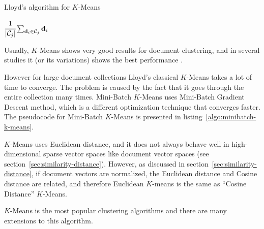 \begin{algorithm}
\caption{Lloyd's algorithm for $K$-Means}
\label{algo:k-means}

\begin{algorithmic}[0]
  \Statex
     
    \EndFor

       
      \EndFor

       
            {$\cfrac{1}{| \mathcal C_j |} \sum_{\mathbf d_i \in \mathcal C_j} \mathbf d_i$}
      \EndFor
    \EndWhile

    \State {}
  \EndFunction
\end{algorithmic}
\end{algorithm}

Usually, $K$-Means shows very good results for document clustering, and in
several studies it (or its variations) shows the best performance \cite{hall2012evaluating} \cite{steinbach2000comparison}.

However for large document collections Lloyd's classical $K$-Means takes a lot
of time to converge. The problem is caused by the fact that it goes through
the entire collection many times. Mini-Batch $K$-Means \cite{sculley2010web}
uses Mini-Batch Gradient Descent method, which is a different optimization technique
that converges faster. The pseudocode for Mini-Batch $K$-Means is presented
in listing~\ref{algo:minibatch-k-means}.

$K$-Means uses Euclidean distance, and it does not always behave 
well in high-dimensional sparse vector spaces like document vector 
spaces (see section~\ref{sec:similarity-distance}). However,
as discussed in section~\ref{sec:similarity-distance}, if document vectors 
are normalized, the Euclidean distance and Cosine distance are related, 
and therefore Euclidean $K$-means is the same as ``Cosine Distance'' $K$-Means.

$K$-Means is the most popular clustering algorithms and there are
many extensions to this algorithm. 

